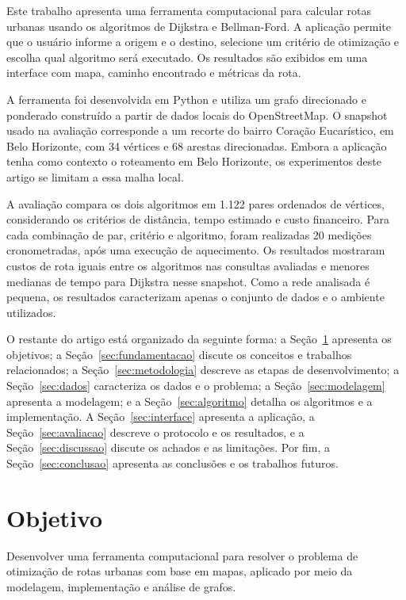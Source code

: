\documentclass[12pt]{article}
\begin{document}
Este trabalho apresenta uma ferramenta computacional para calcular
rotas urbanas usando os algoritmos de Dijkstra e Bellman-Ford. A
aplicação permite que o usuário informe a origem e o destino, selecione
um critério de otimização e escolha qual algoritmo será executado. Os
resultados são exibidos em uma interface com mapa, caminho encontrado e
métricas da rota.

A ferramenta foi desenvolvida em Python e utiliza um grafo direcionado
e ponderado construído a partir de dados locais do OpenStreetMap. O
snapshot usado na avaliação corresponde a um recorte do bairro Coração
Eucarístico, em Belo Horizonte, com 34 vértices e 68 arestas
direcionadas. Embora a aplicação tenha como contexto o roteamento em
Belo Horizonte, os experimentos deste artigo se limitam a essa malha
local.

A avaliação compara os dois algoritmos em 1.122 pares ordenados de
vértices, considerando os critérios de distância, tempo estimado e
custo financeiro. Para cada combinação de par, critério e algoritmo,
foram realizadas 20 medições cronometradas, após uma execução de
aquecimento. Os resultados mostraram custos de rota iguais entre os
algoritmos nas consultas avaliadas e menores medianas de tempo para
Dijkstra nesse snapshot. Como a rede analisada é pequena, os resultados
caracterizam apenas o conjunto de dados e o ambiente utilizados.

O restante do artigo está organizado da seguinte forma: a
Seção~\ref{sec:objetivo} apresenta os objetivos; a
Seção~\ref{sec:fundamentacao} discute os conceitos e trabalhos
relacionados; a Seção~\ref{sec:metodologia} descreve as etapas de
desenvolvimento; a Seção~\ref{sec:dados} caracteriza os dados e o
problema; a Seção~\ref{sec:modelagem} apresenta a modelagem; e a
Seção~\ref{sec:algoritmo} detalha os algoritmos e a implementação. A
Seção~\ref{sec:interface} apresenta a aplicação, a
Seção~\ref{sec:avaliacao} descreve o protocolo e os resultados, e a
Seção~\ref{sec:discussao} discute os achados e as limitações. Por fim,
a Seção~\ref{sec:conclusao} apresenta as conclusões e os trabalhos
futuros.
\section{Objetivo}
\label{sec:objetivo}
Desenvolver uma ferramenta computacional para resolver o problema de otimização de rotas urbanas com base em mapas, aplicado por meio
da modelagem, implementação e análise de grafos.
\end{document}
